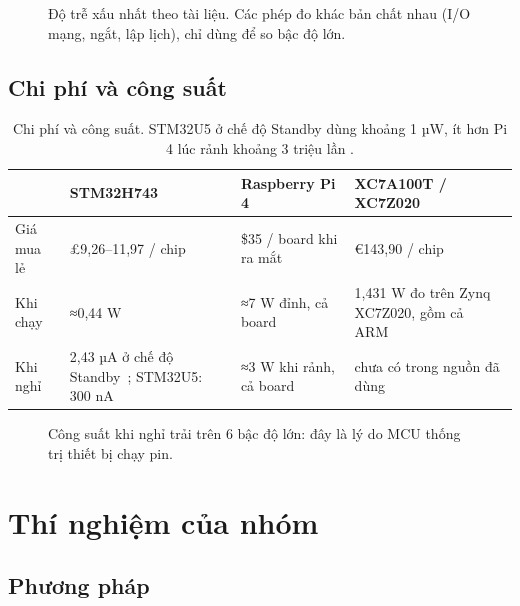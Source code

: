 \documentclass[11pt,a4paper]{article}
\begin{document}
\begin{figure}[htbp]
\centering
{}
\caption{Độ trễ xấu nhất theo tài liệu. Các phép đo khác bản chất nhau (I/O mạng, ngắt, lập lịch), chỉ dùng để so bậc độ lớn.}
\end{figure}

\subsection{Chi phí và công suất}

\begin{table}[h]
\centering\small
\begin{tabularx}{\linewidth}{@{}l Y Y Y@{}}
\toprule
& \MCU{} STM32H743 & \SoC{} Raspberry Pi 4 & \FPGA{} XC7A100T / XC7Z020\\
\midrule
Giá mua lẻ & £9,26–11,97 / chip~\cite{rs} & \$35 / board khi ra mắt~\cite{anand} & €143,90 / chip~\cite{farnell}\\
Khi chạy & ≈0,44 W  & ≈7 W đỉnh, cả board~\cite{techfeed} & 1,431 W đo trên Zynq XC7Z020, gồm cả ARM~\cite{arucu}\\
Khi nghỉ & 2,43 µA ở chế độ Standby~\cite{st-h743}; STM32U5: 300 nA~\cite{arrow} & ≈3 W khi rảnh, cả board & chưa có trong nguồn đã dùng\\
\bottomrule
\end{tabularx}
\caption{Chi phí và công suất. STM32U5 ở chế độ Standby dùng khoảng 1 µW, ít hơn Pi 4 lúc rảnh khoảng 3 triệu lần .}
\end{table}

\begin{figure}[htbp]
\centering
{}
\caption{Công suất khi nghỉ trải trên 6 bậc độ lớn: đây là lý do MCU thống trị thiết bị chạy pin.}
\end{figure}

\section{Thí nghiệm của nhóm}

\subsection{Phương pháp}
\end{document}
